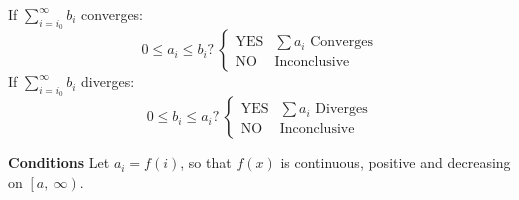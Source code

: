 \documentclass{article}
\begin{document}
\begin{multicols}{2}
\begin{tcolorboxcols}[title={Comparison Test}]
        \noindent If \(\displaystyle \sum_{i=i_0}^\infty b_i\) converges:
        \begin{equation*}
            \text{\(0\leqslant a_i \leqslant b_i\)?}\:
            \begin{cases}
                \text{YES} & \text{\(\sum a_i\) Converges} \\
                \text{NO}  & \text{Inconclusive}
            \end{cases}
        \end{equation*}
        If \(\displaystyle \sum_{i=i_0}^\infty b_i\) diverges:
        \begin{equation*}
            \text{\(0\leqslant b_i \leqslant a_i\)?}\:
            \begin{cases}
                \text{YES} & \text{\(\sum a_i\) Diverges} \\
                \text{NO}  & \text{Inconclusive}
            \end{cases}
        \end{equation*}
    \end{tcolorboxcols}
    \begin{tcolorboxcols}[title={Integral Test}]
        \textbf{Conditions} Let \(a_i=f(i)\), so that \(f(x)\) is continuous, positive and decreasing on \(\left[a,\:\infty\right)\). %


\end{tcolorboxcols}
\end{multicols}
\end{document}
